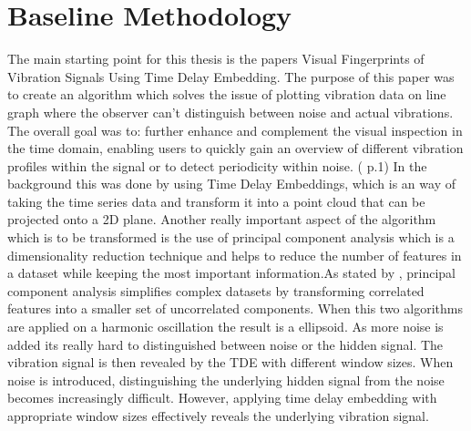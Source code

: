 \section{Baseline Methodology}
The main starting point for this thesis is the papers Visual Fingerprints of Vibration Signals
Using Time Delay Embedding. The purpose of this paper was to create an algorithm which solves the issue of plotting vibration data on line graph where the observer can't distinguish between noise and actual vibrations. The overall goal was to: further enhance and complement the visual inspection in the time
domain, enabling users to quickly gain an overview of different
vibration profiles within the signal or to detect periodicity within
noise. (\cite{rakuschek2025visual} p.1) In the background this was done by using  Time Delay Embeddings, which is an way of taking the time series data and transform it into a point cloud that can be projected onto a 2D plane. Another really important aspect of the algorithm which is to be transformed is the use of principal component analysis which is a dimensionality reduction technique and helps to reduce the number of features in a dataset while keeping the most important information.As stated by \textcite{KarlPearson}, principal component analysis simplifies complex datasets by transforming correlated features into a smaller set of uncorrelated components. When this two algorithms are applied on a harmonic oscillation the result is a ellipsoid. As more noise is added its really hard to distinguished between noise or the hidden signal. The vibration signal is then revealed by the TDE with different window sizes. When noise is introduced, distinguishing the underlying hidden signal from the noise becomes increasingly difficult. However, applying time delay embedding with appropriate window sizes effectively reveals the underlying vibration signal.
